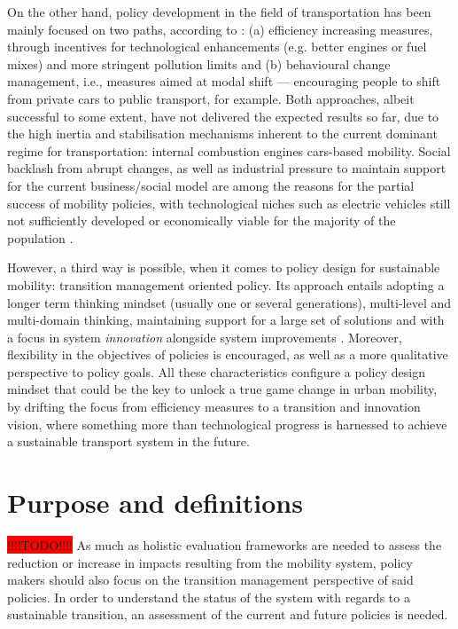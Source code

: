 \documentclass[a4paper,fontsize=11pt,bibliography=totoc]{scrartcl}
\begin{document}
On the other hand, policy development in the field of transportation has been mainly focused on two paths, according to \textcite{koehler2009_transitionsmodelsustainable}: (a) efficiency increasing measures, through incentives for technological enhancements (e.g. better engines or fuel mixes) and more stringent pollution limits and (b) behavioural change management, i.e., measures aimed at modal shift --- encouraging people to shift from private cars to public transport, for example. Both approaches, albeit successful to some extent, have not delivered the expected results so far, due to the high inertia and stabilisation mechanisms inherent to the current dominant regime for transportation: internal combustion engines cars-based mobility. Social backlash from abrupt changes, as well as industrial pressure to maintain support for the current business/social model are among the reasons for the partial success of mobility policies, with technological niches such as electric vehicles still not sufficiently developed or economically viable for the majority of the population \parencite{geels2012_AutomobilityTransitionSocio,nykvist2008_multilevelanalysis}.

However, a third way is possible, when it comes to policy design for sustainable mobility: transition management oriented policy. Its approach entails adopting a longer term thinking mindset (usually one or several generations), multi-level and multi-domain thinking, maintaining support for a large set of solutions and with a focus in system \textit{innovation} alongside system improvements \parencite{rotmans2001_Moreevolutionthan}. Moreover, flexibility in the objectives of policies is encouraged, as well as a more qualitative perspective to policy goals. All these characteristics configure a policy design mindset that could be the key to unlock a true game change in urban mobility, by drifting the focus from efficiency measures to a transition and innovation vision, where something more than technological progress is harnessed to achieve a sustainable transport system in the future.

\section{Purpose and definitions}
\colorbox{red}{!!!!TODO!!!!}
As much as holistic evaluation frameworks are needed to assess the reduction or increase in impacts resulting from the mobility system, policy makers should also focus on the transition management perspective of said policies. In order to understand the status of the system with regards to a sustainable transition, an assessment of the current and future policies is needed.
\end{document}
